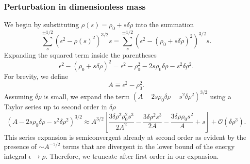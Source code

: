 \subsubsection{Perturbation in dimensionless mass}
We begin by substituting \(\rho(s) = \rho_{0} + s\delta\rho\) into the summation
\begin{equation}
\sum_{s}^{\pm1/2} \left( \epsilon^{2} - \rho(s)^{2} \right)^{3/2} s = \sum_{s}^{\pm1/2} \left( \epsilon^{2} - \left( \rho_{0} + s\delta\rho \right)^{2} \right)^{3/2} s.
\end{equation}
Expanding the squared term inside the parentheses
\begin{equation}
\epsilon^{2} - \left( \rho_{0} + s\delta\rho \right)^{2} = \epsilon^{2} - \rho_{0}^{2} - 2s\rho_{0}\delta\rho - s^{2}\delta\rho^{2}.
\end{equation}
For brevity, we define
\begin{equation}
A \equiv \epsilon^{2} - \rho_{0}^{2}.
\end{equation}
Assuming \(\delta\rho\) is small, we expand the term \(\left( A - 2s\rho_{0}\delta\rho - s^{2}\delta\rho^{2} \right)^{3/2}\) using a Taylor series up to second order in \(\delta\rho\)
\begin{equation}
\left( A - 2s\rho_{0}\delta\rho - s^{2}\delta\rho^{2} \right)^{3/2} \approx A^{3/2} \left[ \frac{3 \delta \rho ^2 \rho _0^2 s^3}{2 A^2}-\frac{3 \delta \rho ^2 s^3}{2 A}-\frac{3 \delta \rho  \rho _0 s^2}{A}+s \right] + \mathcal{O}(\delta\rho^{3}).
\end{equation}
This series expansion is semiconvergent already at second order as evident by the presence of \(\sim A^{-1/2}\) terms that are divergent in the lower bound of the energy integral \(\epsilon\rightarrow\rho\). Therefore, we truncate after first order in our expansion.

